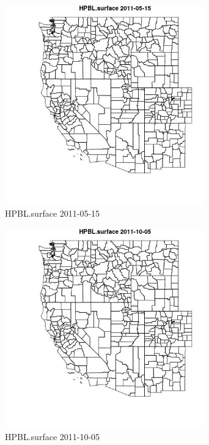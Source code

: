 \begin{figure} 
\centering  
\includegraphics[width=0.77\textwidth]{Code_Outputs/ML_input_report_ML_input_PM25_Step5_part_d_de_duplicated_aves_ML_input_MapObsHPBLsurface2011-05-15.jpg} 
\caption{\label{fig:ML_input_report_ML_input_PM25_Step5_part_d_de_duplicated_aves_ML_inputMapObsHPBLsurface2011-05-15}HPBL.surface 2011-05-15} 
\end{figure} 
 

\begin{figure} 
\centering  
\includegraphics[width=0.77\textwidth]{Code_Outputs/ML_input_report_ML_input_PM25_Step5_part_d_de_duplicated_aves_ML_input_MapObsHPBLsurface2011-10-05.jpg} 
\caption{\label{fig:ML_input_report_ML_input_PM25_Step5_part_d_de_duplicated_aves_ML_inputMapObsHPBLsurface2011-10-05}HPBL.surface 2011-10-05} 
\end{figure} 
 

